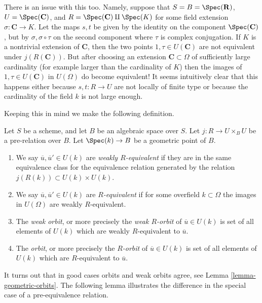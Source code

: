 \medskip\noindent
There is an issue with this too. Namely, suppose that
$S = B = \Spec(\mathbf{R})$,
$U = \Spec(\mathbf{C})$, and
$R = \Spec(\mathbf{C}) \amalg \Spec(K)$
for some field extension $\sigma : \mathbf{C} \to K$.
Let the maps $s, t$ be given by the identity on the component
$\Spec(\mathbf{C})$, but by $\sigma, \sigma \circ \tau$ on the
second component where $\tau$ is complex conjugation. If
$K$ is a nontrivial extension of $\mathbf{C}$, then the two points
$1, \tau \in U(\mathbf{C})$ are not equivalent under
$j(R(\mathbf{C}))$. But after choosing an extension $\mathbf{C} \subset \Omega$
of sufficiently large cardinality (for example larger than the cardinality
of $K$) then the images of $1, \tau \in U(\mathbf{C})$ in
$U(\Omega)$ do become equivalent! It seems intuitively clear that
this happens either because $s, t : R \to U$ are not locally of finite type
or because the cardinality of the field $k$ is not large enough.

\medskip\noindent
Keeping this in mind we make the following definition.

\begin{definition}
\label{definition-geometric-orbits}
Let $S$ be a scheme, and let $B$ be an algebraic space over $S$.
Let $j : R \to U \times_B U$ be a pre-relation over $B$.
Let $\Spec(k) \to B$ be a geometric point of $B$.
\begin{enumerate}
\item We say $\overline{u}, \overline{u}' \in U(k)$ are
{\it weakly $R$-equivalent} if they are in the same equivalence class
for the equivalence relation generated by the relation
$j(R(k)) \subset U(k) \times U(k)$.
\item We say $\overline{u}, \overline{u}' \in U(k)$ are
{\it $R$-equivalent} if for some overfield $k \subset \Omega$
the images in $U(\Omega)$ are weakly $R$-equivalent.
\item The {\it weak orbit}, or more precisely the {\it weak $R$-orbit}
of $\overline{u} \in U(k)$ is set of all
elements of $U(k)$ which are weakly $R$-equivalent to $\overline{u}$.
\item The {\it orbit}, or more precisely the {\it $R$-orbit}
of $\overline{u} \in U(k)$ is set of all
elements of $U(k)$ which are $R$-equivalent to $\overline{u}$.
\end{enumerate}
\end{definition}

\noindent
It turns out that in good cases orbits and weak orbits agree, see
Lemma \ref{lemma-geometric-orbits}. The following lemma illustrates
the difference in the special case of a pre-equivalence relation.

